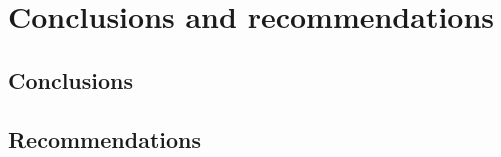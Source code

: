 \chapter{Conclusions and recommendations}\label{chapt:future}

\section{Conclusions}




\section{Recommendations}